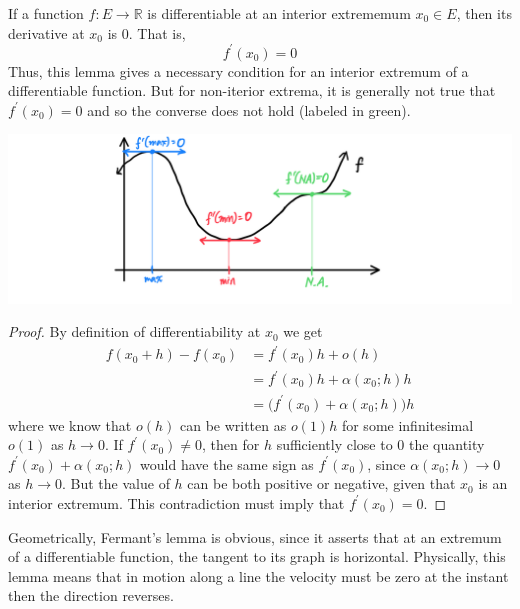     \begin{lemma}[Fermant]
      If a function $f: E \longrightarrow \mathbb{R}$ is differentiable at an interior extrememum $x_0 \in E$, then its derivative at $x_0$ is $0$. That is, 
      \[f^\prime (x_0) = 0\]
      Thus, this lemma gives a necessary condition for an interior extremum of a differentiable function. But for non-iterior extrema, it is generally not true that $f^\prime(x_0) = 0$ and so the converse does not hold (labeled in green). 
      \begin{center}
          \includegraphics[scale=0.25]{img/Fermant_Condition_for_Extrema.PNG}
      \end{center}
    \end{lemma}
    \begin{proof}
    By definition of differentiability at $x_0$ we get
    \begin{align*}
        f(x_0 + h) - f(x_0) & = f^\prime (x_0) h + o(h) \\
        & = f^\prime(x_0) h + \alpha (x_0; h) h \\
        & = \big(f^\prime (x_0) + \alpha(x_0; h)\big) h
    \end{align*}
    where we know that $o(h)$ can be written as $o(1) h$ for some infinitesimal $o(1)$ as $h \rightarrow 0$. If $f^\prime (x_0) \neq 0$, then for $h$ sufficiently close to $0$ the quantity $f^\prime(x_0) + \alpha(x_0; h)$ would have the same sign as $f^\prime (x_0)$, since $\alpha(x_0; h) \rightarrow 0$ as $h \rightarrow 0$. But the value of $h$ can be both positive or negative, given that $x_0$ is an interior extremum. This contradiction must imply that $f^\prime (x_0) = 0$. 
    \end{proof}

    Geometrically, Fermant's lemma is obvious, since it asserts that at an extremum of a differentiable function, the tangent to its graph is horizontal. Physically, this lemma means that in motion along a line the velocity must be zero at the instant then the direction reverses. 

